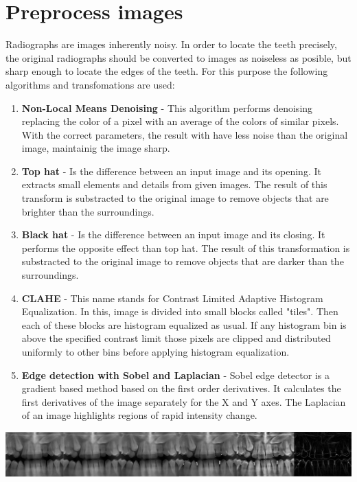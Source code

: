 \section{Preprocess images}

Radiographs are images inherently noisy. In order to locate
the teeth precisely, the original radiographs should be
converted to images as noiseless as posible, but sharp
enough to locate the edges of the teeth. For this purpose
the following algorithms and transfomations are used:

\begin{enumerate}
  \item \textbf{Non-Local Means Denoising} - This algorithm
  performs denoising replacing the color of a pixel with
  an average of the colors of similar pixels. With the correct
  parameters, the result with have less noise than the original
  image, maintainig the image sharp.
\item \textbf{Top hat} - Is the difference between an input
  image and its opening. It extracts small elements and details
  from given images. The result of this transform is substracted
  to the original image to remove objects that are brighter than
  the surroundings.
\item \textbf{Black hat} - Is the difference between an input
  image and its closing. It performs the opposite effect than
  top hat. The result of this transformation is substracted to
  the original image to remove objects that are darker than the
  surroundings.
\item \textbf{CLAHE} - This name stands for Contrast Limited
  Adaptive Histogram Equalization. In this, image is divided
  into small blocks called "tiles". Then each of these blocks
  are histogram equalized as usual. If any histogram bin is
  above the specified contrast limit those pixels are clipped
  and distributed uniformly to other bins before applying
  histogram equalization.
\item \textbf{Edge detection with Sobel and Laplacian} - Sobel
  edge detector is a gradient based method based on the first
  order derivatives. It calculates the first derivatives of
  the image separately for the X and Y axes. The Laplacian of
  an image highlights regions of rapid intensity change.
\end{enumerate}

  \includegraphics[width=\linewidth]{img/enhancenment}
